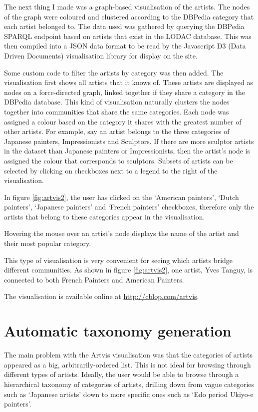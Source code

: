 \documentclass[11pt]{article}
\begin{document}
The next thing I made was a graph-based visualisation of the artists. The nodes of the graph were coloured and clustered according to the DBPedia category that each artist belonged to.  The data used was gathered by querying the DBPedia SPARQL endpoint based on artists that exist in the LODAC database. This was then compiled into a JSON data format to be read by the Javascript D3 (Data Driven Documents) visualisation library \cite{d3} for display on the site. 

Some custom code to filter the artists by category was then added.  The visualisation first shows all artists that it knows of. These artists are displayed as nodes on a force-directed graph, linked together if they share a category in the DBPedia database. This kind of visualisation naturally clusters the nodes together into communities that share the same categories.  Each node was assigned a colour based on the category it shares with the greatest number of other artists. For example, say an artist belongs to the three categories of Japanese painters, Impressionists and Sculptors. If there are more sculptor artists in the dataset than Japanese painters or Impressionists, then the artist's node is assigned the colour that corresponds to sculptors.  Subsets of artists can be selected by clicking on checkboxes next to a legend to the right of the visualisation.

In figure \ref{fig:artvis2}, the user has clicked on the `American painters', `Dutch painters', `Japanese painters' and `French painters' checkboxes, therefore only the artists that belong to these categories appear in the visualisation.

Hovering the mouse over an artist's node displays the name of the artist and their most popular category.

This type of visualisation is very convenient for seeing which artists bridge different communities. As shown in figure \ref{fig:artvis2}, one artist, Yves Tanguy, is connected to both French Painters and American Painters.

The visualisation is available online at \url{http://cblop.com/artvis}.

\section{Automatic taxonomy generation}
The main problem with the Artvis visualisation was that the categories of artists appeared as a big, arbitrarily-ordered list. This is not ideal for browsing through different types of artists. Ideally, the user would be able to browse through a hierarchical taxonomy of categories of artists, drilling down from vague categories such as `Japanese artists' down to more specific ones such as `Edo period Ukiyo-e painters'.
\end{document}
